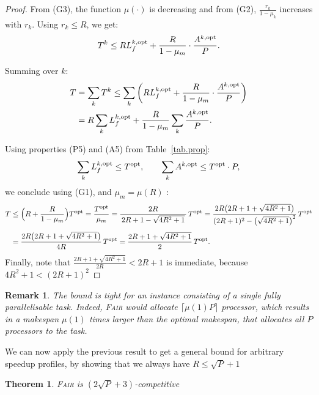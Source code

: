 \documentclass{article}
\newtheorem{remark}{Remark}
\newtheorem{theorem}{Theorem}
\newcommand\fair{\textsc{Fair}\xspace}
\newcommand\ratio{R\xspace}
\newcommand\rratio{r\xspace}
\newcommand\opt{\textnormal{opt}\xspace}
\begin{document}
\begin{proof}
From (G3), the function $\mu(\cdot)$ is decreasing and from (G2), $\frac{\rratio_k}{1 - \mu_k}$ increases with $\rratio_k$. Using $\rratio_k \leq \ratio$, we get:
\[
T^k \leq \ratio L_f^{k,\opt} + \frac{\ratio}{1 - \mu_m} \cdot \frac{A^{k,\opt}}{P}.
\]

Summing over $k$:
\begin{align*}
T &= \sum_k T^k
\leq \sum_k \left( \ratio L_f^{k,\opt} + \frac{\ratio}{1 - \mu_m} \cdot \frac{A^{k,\opt}}{P} \right) \\
&= \ratio \sum_k L_f^{k,\opt} + \frac{\ratio}{1 - \mu_m} \sum_k \frac{A^{k,\opt}}{P}.
\end{align*}

Using properties (P5) and (A5) from Table~\ref{tab.prop}:
\[
\sum_k L_f^{k,\opt} \leq T^{\opt}, \qquad \sum_k A^{k,\opt} \leq T^{\opt} \cdot P,
\]
we conclude using (G1), and $\mu_m=\mu(\ratio)$ :
\[
\begin{aligned}
T 
&\le \Bigl(\ratio + \frac{\ratio}{1-\mu_m}\Bigr) T^{\opt}  = \frac{T^{\opt}}{\mu_m}= \frac{2\ratio}{\,2\ratio + 1 - \sqrt{4\ratio^{2}+1}\,}\,T^{\opt}= \frac{2\ratio\bigl(2\ratio + 1 + \sqrt{4\ratio^{2}+1}\bigr)}
        {(2\ratio + 1)^{2}-\bigl(\sqrt{4\ratio^{2}+1}\bigr)^{2}}\,T^{\opt}\\[4pt]
&= \frac{2\ratio\bigl(2\ratio + 1 + \sqrt{4\ratio^{2}+1}\bigr)}
        {4\ratio}\,T^{\opt} = \frac{2\ratio + 1 + \sqrt{4\ratio^{2}+1}}{2}\,T^{\opt}.
\end{aligned}
\]
Finally, note that $\frac{2\ratio+1+\sqrt{4\ratio^2+1}}{2\ratio}<2\ratio+1$ is immediate, because $4\ratio^2+1<(2\ratio+1)^2$
\end{proof}

\begin{remark}
The bound is tight for an instance consisting of a single fully parallelisable task. Indeed, \fair would allocate $\lceil \mu(1)P \rceil$ processor, which results in a makespan $\mu(1)$ times larger than the optimal makespan, that allocates all $P$ processors to the task.
\end{remark}

We can now apply the previous result to get a general bound for arbitrary speedup profiles, by showing that we always have $\ratio \leq \sqrt{P}+1$

\begin{theorem}
\fair is $(2\sqrt{P}+3)$-competitive
\end{theorem}
\end{document}
